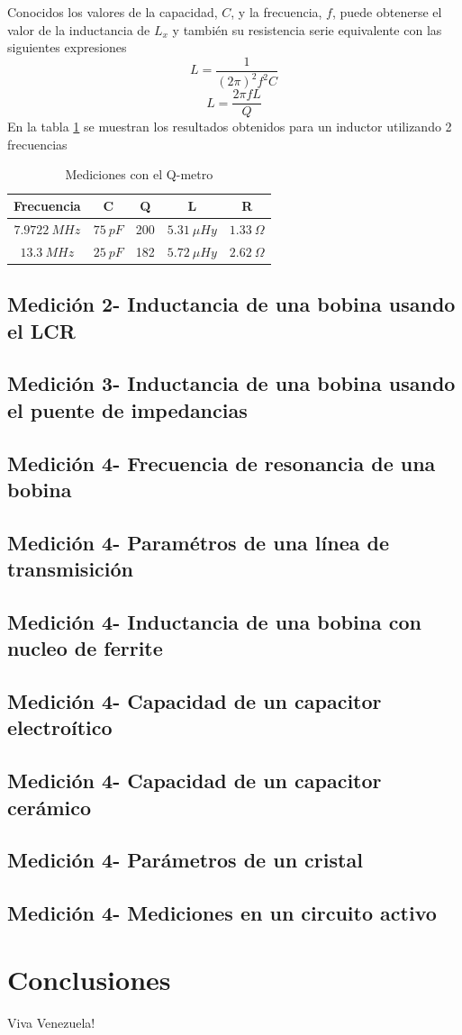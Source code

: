 \documentclass[a4paper,10pt]{article}
\begin{document}
		Conocidos los valores de la capacidad, $C$, y la frecuencia, $f$, puede obtenerse el valor de la inductancia de $L_x$ y tambi\'en su resistencia serie equivalente con las siguientes expresiones
		$$L=\frac{1}{(2\pi)^2 f^2C}$$
		$$L=\frac{2\pi fL}{Q}$$
		En la tabla \ref{tab001} se muestran los resultados obtenidos para un inductor utilizando 2 frecuencias
		
		\begin{table}[!htp]
					\centering
					\begin{tabular}{|c|c|c|c|c|}
						\hline
			    		Frecuencia & C & Q & L & R \\
						\hline
						$7.9722~MHz$& $75~pF$& 200 & $5.31~\mu Hy$ &$ 1.33~\Omega$ \\
						\hline
						$13.3~MHz$& $25~pF$& 182 & $5.72~\mu Hy$ &$ 2.62~\Omega$ \\
						\hline  
					\end{tabular}
					\caption{Mediciones con el Q-metro} \label{tab001}
				\end{table}	
		\subsection{Medici\'on 2- Inductancia de una bobina usando el LCR}
		\subsection{Medici\'on 3- Inductancia de una bobina usando el puente de impedancias}
		\subsection{Medici\'on 4- Frecuencia de resonancia de una bobina}
		\subsection{Medici\'on 4- Param\'etros de una l\'inea de transmisici\'on}
		\subsection{Medici\'on 4- Inductancia de una bobina con nucleo de ferrite}
		\subsection{Medici\'on 4- Capacidad de un capacitor electro\'itico}	
		\subsection{Medici\'on 4- Capacidad de un capacitor cer\'amico}
		\subsection{Medici\'on 4- Par\'ametros de un cristal}
		\subsection{Medici\'on 4- Mediciones en un circuito activo}	
	\section{Conclusiones}
	\indent Viva Venezuela!\\
\end{document}

